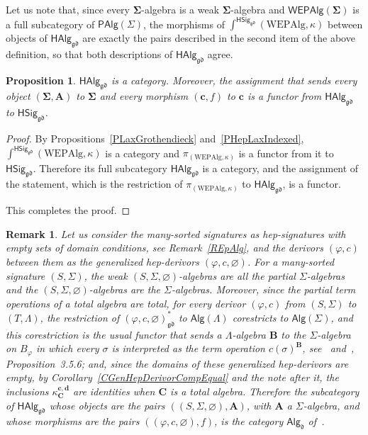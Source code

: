 \documentclass[a4paper, reqno]{amsbook}
\newcommand{\sig}[1]{\mathbf{#1}}             %
\newcommand{\gd}{\mathfrak{gd}}              %
\theoremstyle{plain}
\newtheorem{proposition}[theorem]{Proposition}
\newtheorem{remark}[theorem]{Remark}
\theoremstyle{definition}
\begin{document}
Let us note that, since every $\sig{\Sigma}$-algebra is a weak $\sig{\Sigma}$-algebra and $\mathsf{WEPAlg}(\sig{\Sigma})$ is a full subcategory of $\mathsf{PAlg}(\Sigma)$, the morphisms of $\int^{\mathsf{HSig}_{\gd}}(\mathrm{WEPAlg},\kappa)$ between objects of $\mathsf{HAlg}_{\gd}$ are exactly the pairs described in the second item of the above definition, so that both descriptions of $\mathsf{HAlg}_{\gd}$ agree.

\begin{proposition}\label{PHepAlgCat}
$\mathsf{HAlg}_{\gd}$ is a category.
Moreover, the assignment that sends every object $(\sig{\Sigma},\mathbf{A})$ to $\sig{\Sigma}$ and every morphism $(\mathbf{c},f)$ to $\mathbf{c}$ is a functor from $\mathsf{HAlg}_{\gd}$ to $\mathsf{HSig}_{\gd}$.
\end{proposition}
\begin{proof}
By Propositions~\ref{PLaxGrothendieck} and~\ref{PHepLaxIndexed}, $\int^{\mathsf{HSig}_{\gd}}(\mathrm{WEPAlg},\kappa)$ is a category and $\pi_{(\mathrm{WEPAlg},\kappa)}$ is a functor from it to $\mathsf{HSig}_{\gd}$.
Therefore its full subcategory $\mathsf{HAlg}_{\gd}$ is a category, and the assignment of the statement, which is the restriction of $\pi_{(\mathrm{WEPAlg},\kappa)}$ to $\mathsf{HAlg}_{\gd}$, is a functor.

This completes the proof.
\end{proof}

\begin{remark}\label{RHepAlgCat}
Let us consider the many-sorted signatures as hep-signatures with empty sets of domain conditions, see Remark~\ref{REpAlg}, and the derivors $(\varphi,c)$ between them as the generalized hep-derivors $(\varphi,c,\varnothing)$.
For a many-sorted signature $(S,\Sigma)$, the weak $(S,\Sigma,\varnothing)$-algebras are all the partial $\Sigma$-algebras and the $(S,\Sigma,\varnothing)$-algebras are the $\Sigma$-algebras.
Moreover, since the partial term operations of a total algebra are total, for every derivor $(\varphi,c)$ from $(S,\Sigma)$ to $(T,\Lambda)$, the restriction of $(\varphi,c,\varnothing)^{\ast}_{\gd}$ to $\mathsf{Alg}(\Lambda)$ corestricts to $\mathsf{Alg}(\Sigma)$, and this corestriction is the usual functor that sends a $\Lambda$-algebra $\mathbf{B}$ to the $\Sigma$-algebra on $B_{\varphi}$ in which every $\sigma$ is interpreted as the term operation $c(\sigma)^{\mathbf{B}}$, see~\cite{ClimentSoliveres2010b} and~\cite{Soliveres2000}, Proposition~3.5.6; and, since the domains of these generalized hep-derivors are empty, by Corollary~\ref{CGenHepDerivorCompEqual} and the note after it, the inclusions $\kappa^{\mathbf{c},\mathbf{d}}_{\mathbf{C}}$ are identities when $\mathbf{C}$ is a total algebra.
Therefore the subcategory of $\mathsf{HAlg}_{\gd}$ whose objects are the pairs $((S,\Sigma,\varnothing),\mathbf{A})$, with $\mathbf{A}$ a $\Sigma$-algebra, and whose morphisms are the pairs $((\varphi,c,\varnothing),f)$, is the category $\mathsf{Alg}_{\mathfrak{d}}$ of~\cite{ClimentSoliveres2010b}.
\end{remark}
\end{document}
